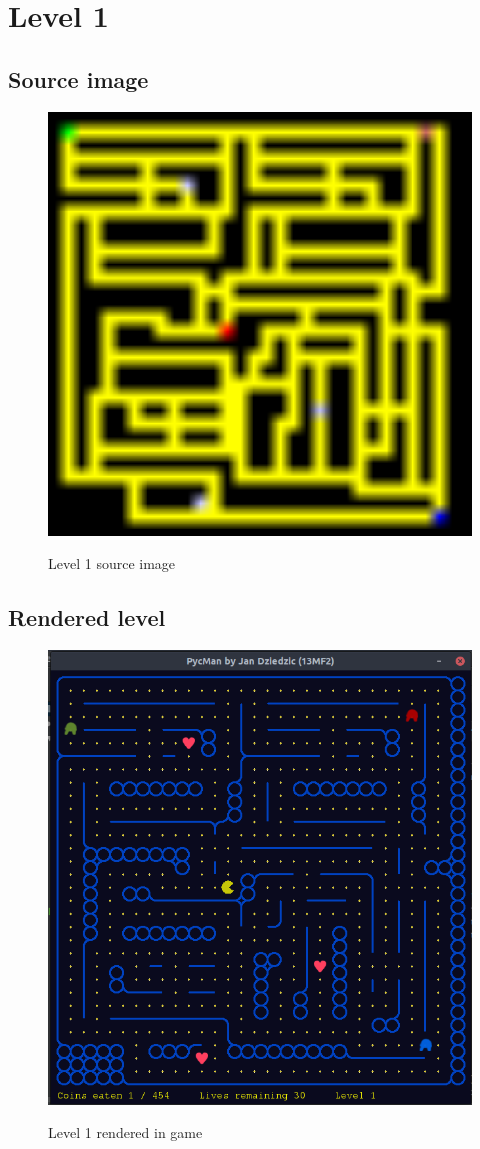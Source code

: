 \documentclass[11pt,a4paper,notitlepage]{report}
\newcommand{\dsubsection}[1]{\FloatBarrier \subsection{#1}}
\newenvironment{img}{
	\begin{center}
		\begin{figure}[H]
			\begin{center}
			
}{
	\end{center}
		\end{figure}
			\end{center}
}
\begin{document}
		\section{Level 1}
			\dsubsection{Source image}
			\begin{img}
				\includegraphics[width=350pt]{images/level1}\\
				\caption{Level 1 source image}
			\end{img}
			\dsubsection{Rendered level}
				\begin{img}
					\includegraphics[width=350pt]{images/level1_r}\\
					\caption{Level 1 rendered in game}
				\end{img}
\end{document}
